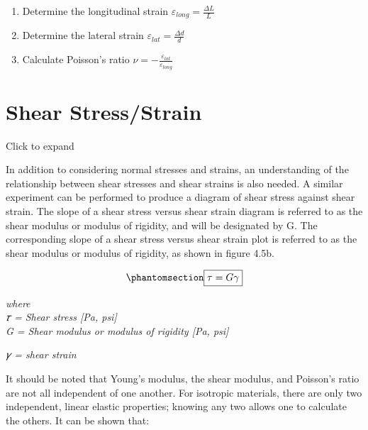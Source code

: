 \documentclass[
  letterpaper,
  DIV=11,
  numbers=noendperiod]{scrreprt}
\theoremstyle{definition}
\theoremstyle{remark}
\begin{document}
\begin{tcolorbox}[enhanced jigsaw, leftrule=.75mm, colbacktitle=quarto-callout-warning-color!10!white, breakable, opacityback=0, colback=white, titlerule=0mm, toprule=.15mm, colframe=quarto-callout-warning-color-frame, coltitle=black, title={Step-by-step:}, toptitle=1mm, bottomrule=.15mm, rightrule=.15mm, left=2mm, arc=.35mm, opacitybacktitle=0.6, bottomtitle=1mm]

\begin{enumerate}
\def\labelenumi{\arabic{enumi}.}
\item
  Determine the longitudinal strain
  \(\varepsilon_{long}=\frac{\Delta L}{L}\)
\item
  Determine the lateral strain
  \(\varepsilon_{l a t}=\frac{\Delta d}{d}\)
\item
  Calculate Poisson's ratio
  \(\nu=-\frac{\varepsilon_{lat}}{\varepsilon_{long}}\)
\end{enumerate}

\end{tcolorbox}

\section{Shear Stress/Strain}\label{sec-4.5}

Click to expand

In addition to considering normal stresses and strains, an understanding
of the relationship between shear stresses and shear strains is also
needed. A similar experiment can be performed to produce a diagram of
shear stress against shear strain. The slope of a shear stress versus
shear strain diagram is referred to as the shear modulus or modulus of
rigidity, and will be designated by G. The corresponding slope of a
shear stress versus shear strain plot is referred to as the shear
modulus or modulus of rigidity, as shown in figure 4.5b.

\begin{equation}\phantomsection\label{eq-4.3}{
\boxed{\tau=G \gamma}
}\end{equation}

\emph{where}\\
\emph{𝜏 = Shear stress {[}Pa, psi{]}}\\
\emph{G = Shear modulus or modulus of rigidity {[}Pa, psi{]}}

\emph{𝛾 = shear strain}

It should be noted that Young's modulus, the shear modulus, and
Poisson's ratio are not all independent of one another. For isotropic
materials, there are only two independent, linear elastic properties;
knowing any two allows one to calculate the others. It can be shown
that:
\end{document}
